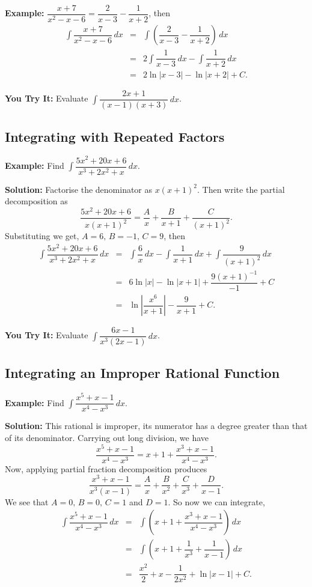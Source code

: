 \documentclass[titlepage,a4paper,12pt]{report}
\begin{document}
\noindent \textbf{Example:} $\dfrac{x+7}{x^2-x-6}=\dfrac{2}{x-3}-\dfrac{1}{x+2}$, then 
\begin{eqnarray*}
\int \dfrac{x+7}{x^2-x-6}\, dx &=&\int \left(\dfrac{2}{x-3}-\dfrac{1}{x+2}\right)\, dx \\
&=& 2\int \dfrac{1}{x-3}\, dx -\int \dfrac{1}{x+2}\, dx\\
&=& 2\ln |x-3|-\ln |x+2| +C.
\end{eqnarray*}

\noindent \textbf{You Try It:} Evaluate $\displaystyle \int \dfrac{2x+1}{(x-1)(x+3)}\, dx$.
\subsection{Integrating with Repeated Factors}
 \textbf{Example:} Find $\displaystyle \int \dfrac{5x^2+20x+6}{x^3+2x^2+x}\, dx$.
 
 \noindent \textbf{Solution:} Factorise the denominator as $x(x+1)^2$. Then write the partial decomposition as 
 \begin{equation*}
 \dfrac{5x^2+20x+6}{x(x+1)^2}=\dfrac{A}{x}+\dfrac{B}{x+1} +\dfrac{C}{(x+1)^2}.
 \end{equation*}
 Substituting we get, $A=6, \, B=-1, \, C=9$, then 
 \begin{eqnarray*}
 \int \dfrac{5x^2+20x+6}{x^3+2x^2+x}\, dx &=& \int \dfrac{6}{x}\, dx -\int \dfrac{1}{x+1}\, dx +\int \dfrac{9}{(x+1)^2}\, dx\\
 &=& 6\ln |x|-\ln |x+1|+\dfrac{9(x+1)^{-1}}{-1} +C\\
 &=& \ln \left|\dfrac{x^6}{x+1}\right|-\dfrac{9}{x+1}+C.
 \end{eqnarray*}
 
 \noindent \textbf{You Try It:} Evaluate $\displaystyle \int \dfrac{6x-1}{x^3(2x-1)}\, dx$.
 \subsection{Integrating an Improper Rational Function}
 \textbf{Example:} Find $\displaystyle \int \dfrac{x^5+x-1}{x^4-x^3}\, dx$.
 
 \noindent \textbf{Solution:} This rational is improper, its numerator has a degree greater than that of its denominator. Carrying out long division, we have
 \begin{equation*}
\dfrac{x^5+x-1}{x^4-x^3} =x+1 +\dfrac{x^3+x-1}{x^4-x^3}.
 \end{equation*}
 Now, applying partial fraction decomposition produces
 \begin{equation*}
 \dfrac{x^3+x-1}{x^3(x-1)} =\dfrac{A}{x}+\dfrac{B}{x^2}+\dfrac{C}{x^3}+\dfrac{D}{x-1}.
 \end{equation*}
 We see that $A=0, \, B=0, \, C=1$ and $D=1$. So now we can integrate, 
 \begin{eqnarray*}
 \int \dfrac{x^5+x-1}{x^4-x^3}\, dx &=& \int \left(x+1+\dfrac{x^3+x-1}{x^4-x^3}\right)\, dx\\
 &=& \int \left(x+1+\dfrac{1}{x^3}+\dfrac{1}{x-1}\right)\, dx\\
 &=& \dfrac{x^2}{2}+x-\dfrac{1}{2x^2}+\ln |x-1|+C.
 \end{eqnarray*}
 
\end{document}
